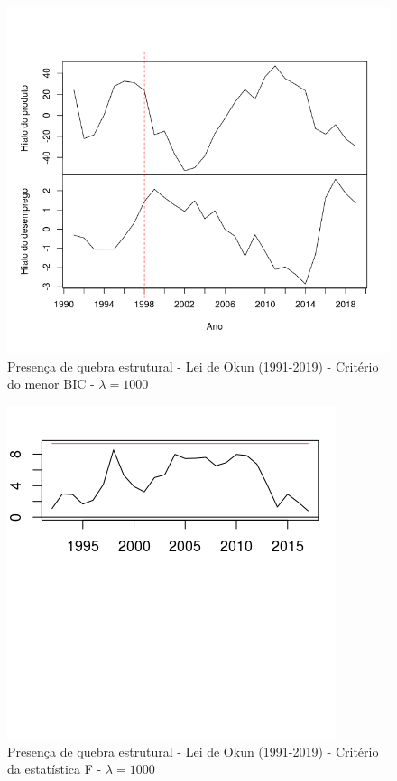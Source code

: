 \documentclass[11pt]{beamer}
\begin{document}
\begin{frame}

\begin{figure}[H]
	\centering
	\caption*{Presença de quebra estrutural - Lei de Okun (1991-2019) - Critério do menor BIC - $\lambda = 1000$}
	\label{fig:quebra_estrutural}
	\includegraphics[width=0.70\linewidth]{"Figuras/quebra_estrutural.png"}
\end{figure}

\end{frame}


\begin{frame}

\begin{figure}[H]
	\centering
	\caption*{Presença de quebra estrutural - Lei de Okun (1991-2019) - Critério da estatística F - $\lambda = 1000$}
	\label{fig:quebra_estrutural_F}
	\includegraphics[width=0.75\linewidth]{"Figuras/quebra_estrutural_1000.png"}
\end{figure}

\end{frame}
\end{document}
